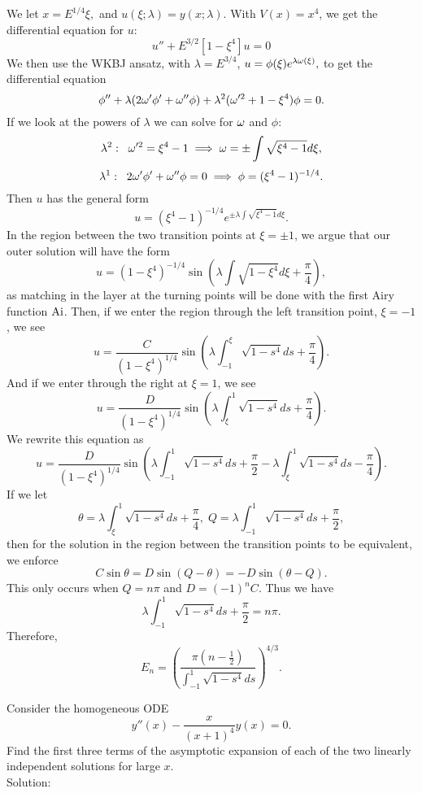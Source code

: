We let $x=E^{1/4}\xi,$ and $u(\xi;\lambda)=y(x;\lambda).$ With $V(x)=x^4$, we get the differential equation for $u$:
$$u''+E^{3/2}[1-\xi^4]u=0$$
We then use the WKBJ ansatz, with $\lambda=E^{3/4}$, $u=\phi(\xi)e^{\lambda\omega(\xi)},$ to get the differential equation
$$\phi''+\lambda(2\omega'\phi'+\omega''\phi)+\lambda^2(\omega'^2+1-\xi^4)\phi=0.$$
If we look at the powers of $\lambda$ we can solve for $\omega$ and $\phi$:
$$\lambda^2:\;\; \omega'^2=\xi^4-1\implies \omega=\pm\int\sqrt{\xi^4-1}d\xi,$$
$$\lambda^1:\;\; 2\omega'\phi'+\omega''\phi=0\implies \phi=(\xi^4-1)^{-1/4}.$$
Then $u$ has the general form
$$u=(\xi^4-1)^{-1/4}e^{\pm\lambda\int\sqrt{\xi^4-1}d\xi}.$$
In the region between the two transition points at $\xi=\pm 1$, we argue that our outer solution will have the form
$$u=(1-\xi^4)^{-1/4}\sin\left(\lambda\int\sqrt{1-\xi^4}d\xi+\frac{\pi}{4}\right),$$
as matching in the layer at the turning points will be done with the first Airy function ${\rm Ai}$. Then, if we enter the region through the left transition point, $\xi=-1$, we see
$$u=\frac{C}{(1-\xi^4)^{1/4}}\sin\left(\lambda\int_{-1}^\xi\sqrt{1-s^4}ds+\frac{\pi}{4}\right).$$
And if we enter through the right at $\xi=1$, we see
$$u=\frac{D}{(1-\xi^4)^{1/4}}\sin\left(\lambda\int_{\xi}^1\sqrt{1-s^4}ds+\frac{\pi}{4}\right).$$
We rewrite this equation as
$$u=\frac{D}{(1-\xi^4)^{1/4}}\sin\left(\lambda\int_{-1}^1\sqrt{1-s^4}ds+\frac{\pi}{2}-\lambda\int_{\xi}^1\sqrt{1-s^4}ds-\frac{\pi}{4}\right).$$
If we let
$$\theta=\lambda\int_{\xi}^1\sqrt{1-s^4}ds+\frac{\pi}{4},\;Q=\lambda\int_{-1}^1\sqrt{1-s^4}ds+\frac{\pi}{2},$$
then for the solution in the region between the transition points to be equivalent, we enforce
$$C\sin\theta=D\sin(Q-\theta)=-D\sin(\theta-Q).$$
This only occurs when $Q=n\pi$ and $D=(-1)^n C.$ Thus we have
$$\lambda\int_{-1}^1\sqrt{1-s^4}ds+\frac{\pi}{2}=n\pi.$$
Therefore,
$$E_n=\left(\frac{\pi(n-\frac{1}{2})}{\int_{-1}^1\sqrt{1-s^4}ds}\right)^{4/3}.$$


\item Consider the homogeneous ODE
\begin{equation*}
y''(x) - \frac{x}{(x+1)^4} y(x) = 0.
\end{equation*}
Find the first three terms of the asymptotic expansion of each of the two linearly independent solutions for large $x.$\\

Solution:\\

